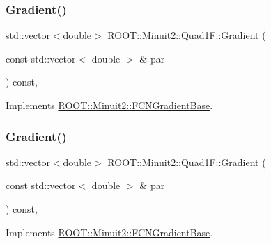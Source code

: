 \mbox{\label{classROOT_1_1Minuit2_1_1Quad1F_a5862cb7b7c00f86bcff155d0033abd7f}} 
\subsubsection{\texorpdfstring{Gradient()}{Gradient()}\hspace{0.1cm}{\footnotesize\ttfamily [1/2]}}
{\footnotesize\ttfamily std\+::vector$<$double$>$ R\+O\+O\+T\+::\+Minuit2\+::\+Quad1\+F\+::\+Gradient (\begin{DoxyParamCaption}\item[{const std\+::vector$<$ double $>$ \&}]{par }\end{DoxyParamCaption}) const\hspace{0.3cm}{\ttfamily [inline]}, {\ttfamily [virtual]}}



Implements \mbox{\hyperlink{classROOT_1_1Minuit2_1_1FCNGradientBase_a004740e7e25a1358aafde6694196ef88}{R\+O\+O\+T\+::\+Minuit2\+::\+F\+C\+N\+Gradient\+Base}}.

\mbox{\label{classROOT_1_1Minuit2_1_1Quad1F_a5862cb7b7c00f86bcff155d0033abd7f}} 
\subsubsection{\texorpdfstring{Gradient()}{Gradient()}\hspace{0.1cm}{\footnotesize\ttfamily [2/2]}}
{\footnotesize\ttfamily std\+::vector$<$double$>$ R\+O\+O\+T\+::\+Minuit2\+::\+Quad1\+F\+::\+Gradient (\begin{DoxyParamCaption}\item[{const std\+::vector$<$ double $>$ \&}]{par }\end{DoxyParamCaption}) const\hspace{0.3cm}{\ttfamily [inline]}, {\ttfamily [virtual]}}



Implements \mbox{\hyperlink{classROOT_1_1Minuit2_1_1FCNGradientBase_a004740e7e25a1358aafde6694196ef88}{R\+O\+O\+T\+::\+Minuit2\+::\+F\+C\+N\+Gradient\+Base}}.

